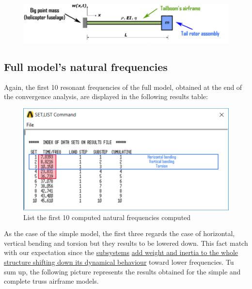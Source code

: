 \smallskip
\begin{figure}[h!]
	\begin{center}
		\centering  		 		
		\includegraphics[width=0.95\linewidth]{PICTURES/2_Lama_truss/PNG/BC0.png}
	\end{center}
\end{figure}	


\clearpage
\subsection*{Full model's natural frequencies}
\noindent
Again, the first 10 resonant frequencies of the full model, obtained at the end of the convergence analysis, are displayed in the following results table:
\begin{figure}[h!]
	\begin{center}
		\centering  		 		
		\includegraphics[width=0.70\linewidth]{PICTURES/2_Lama_truss/PNG/model2/set-list2.png}
	\end{center}
	\caption {List the first 10 computed natural frequencies computed}
\end{figure}
\noindent
As the case of the simple model, the first three regards the case of horizontal, vertical bending and torsion but they results to be lowered down. This fact match with our expectation since the \underline{subsystems} \underline{add weight and inertia to the whole structure shifting down its dynamical behaviour} toward lower frequencies.
Tu sum up, the following picture represents the results obtained for the simple and complete truss airframe models. 
